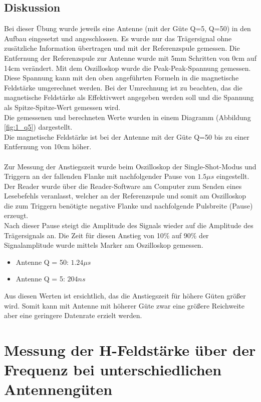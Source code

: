 \documentclass[12pt,a4paper,ngerman]{article}
\begin{document}
\subsection{Diskussion}
Bei dieser Übung wurde jeweils eine Antenne (mit der Güte Q=5, Q=50) in den Aufbau eingesetzt und angeschlossen. Es wurde nur das Trägersignal ohne zusätzliche Information übertragen und mit der Referenzspule gemessen. Die Entfernung der Referenzspule zur Antenne wurde mit 5mm Schritten von 0cm auf 14cm verändert. Mit dem Oszilloskop wurde die Peak-Peak-Spannung gemessen.\\
Diese Spannung kann mit den oben angeführten Formeln in die magnetische Feldstärke umgerechnet werden. Bei der Umrechnung ist zu beachten, das die magnetische Feldstärke als Effektivwert angegeben werden soll und die Spannung als Spitze-Spitze-Wert gemessen wird.\\
Die gemessenen und berechneten Werte wurden in einem Diagramm (Abbildung \ref{fig:1_q5}) dargestellt.\\
Die magnetische Feldstärke ist bei der Antenne mit der Güte Q=50 bis zu einer Entfernung von 10cm höher.\\
\\
Zur Messung der Anstiegszeit wurde beim Oszilloskop der Single-Shot-Modus und Triggern an der fallenden Flanke mit nachfolgender Pause von $1.5\mu s$ eingestellt.\\
Der Reader wurde über die Reader-Software am Computer zum Senden eines Lesebefehls veranlasst, welcher an der Referenzspule und somit am Oszilloskop die zum Triggern benötigte negative Flanke und nachfolgende Pulsbreite (Pause) erzeugt.\\
Nach dieser Pause steigt die Amplitude des Signals wieder auf die Amplitude des Trägersignals an. Die Zeit für diesen Anstieg von 10\% auf 90\% der Signalamplitude wurde mittels Marker am Oszilloskop gemessen.\\
\begin{itemize}
\item Antenne Q = 50: $1.24\mu s$
\item Antenne Q = 5:  $204ns$
\end{itemize}
Aus diesen Werten ist ersichtlich, das die Anstiegszeit für höhere Güten größer wird. Somit kann mit Antenne mit höherer Güte zwar eine größere Reichweite aber eine geringere Datenrate erzielt werden.


\pagebreak



\section{Messung der H-Feldstärke über der Frequenz bei unterschiedlichen Antennengüten}
\end{document}
